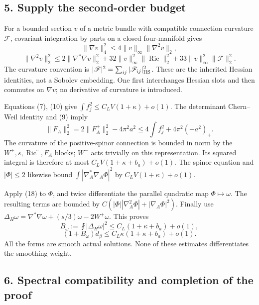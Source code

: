 \documentclass[
  10pt,
]{article}
\begin{document}
\hypertarget{supply-the-second-order-budget}{%
\subsection{5. Supply the second-order
budget}\label{supply-the-second-order-budget}}

For a bounded section \(v\) of a metric bundle with compatible
connection curvature \(\mathscr F\), covariant integration by parts on a
closed four-manifold gives \[
\|\nabla v\|_4^2\le4\|v\|_\infty\|\nabla^2v\|_2,
\] \[
\|\nabla^2v\|_2^2
\le2\|\nabla^*\nabla v\|_2^2
+32\|v\|_\infty^2\|\operatorname{Ric}\|_2^2
+33\|v\|_\infty^2\|\mathscr F\|_2^2.
\tag{18}
\] The curvature convention is
\(|\mathscr F|^2=\sum_{ij} |\mathscr F_{ij}|_{\rm HS}^2\). These are the
inherited Hessian identities, not a Sobolev embedding. One first
interchanges Hessian slots and then commutes on \(\nabla v\); no
derivative of curvature is introduced.

Equations (7), (10) give \(\int f_j^2\le C_L V(1+\kappa)+o(1)\). The
determinant Chern--Weil identity and (9) imply \[
\|F_A\|_2^2=2\|F_A^+\|_2^2-4\pi^2a^2
\le4\int f_j^2+4\pi^2(-a^2)_+.
\] The curvature of the positive-spinor connection is bounded in norm by
the \(W^+,s,\operatorname{Ric}^{\circ},F_A\) blocks; \(W^-\) acts
trivially on this representation. Its squared integral is therefore at
most \(C_LV(1+\kappa+b_a)+o(1)\). The spinor equation and \(|\Phi|\le2\)
likewise bound \(\int|\nabla_A^*\nabla_A\Phi|^2\) by
\(C_LV(1+\kappa)+o(1)\).

Apply (18) to \(\Phi\), and twice differentiate the parallel quadratic
map \(\Phi\mapsto\omega\). The resulting terms are bounded by
\(C(|\Phi||\nabla_A^2\Phi|+|\nabla_A\Phi|^2)\). Finally use
\(\Delta_H\omega=\nabla^*\nabla\omega+(s/3)\omega-2W^+\omega\). This
proves \[
B_\omega:=\fint|\Delta_H\omega|^2
\le C_L(1+\kappa+b_a)+o(1),
\] \[
\boxed{(1+B_\omega)d_\beta
\le C_L\kappa(1+\kappa+b_a)+o(1).}
\tag{19}
\] All the forms are smooth actual solutions. None of these estimates
differentiates the smoothing weight.

\hypertarget{spectral-compatibility-and-completion-of-the-proof}{%
\subsection{6. Spectral compatibility and completion of the
proof}\label{spectral-compatibility-and-completion-of-the-proof}}
\end{document}

